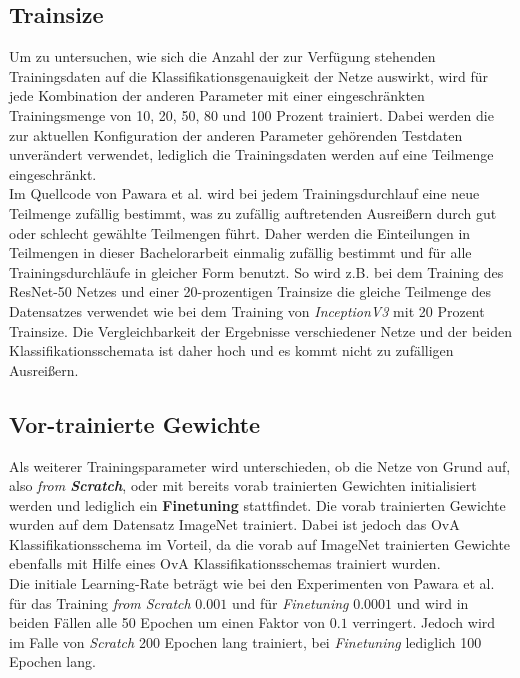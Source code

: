 \subsection{Trainsize}
\label{ch:methodik_trainsize}
Um zu untersuchen, wie sich die Anzahl der zur Verfügung stehenden Trainingsdaten auf die Klassifikationsgenauigkeit der Netze auswirkt, wird für jede Kombination der anderen Parameter mit einer eingeschränkten Trainingsmenge von 10, 20, 50, 80 und 100 Prozent trainiert. Dabei werden die zur aktuellen Konfiguration der anderen Parameter gehörenden Testdaten unverändert verwendet, lediglich die Trainingsdaten werden auf eine Teilmenge eingeschränkt.\\

Im Quellcode von Pawara et al. \cite{pawaraWebsiteCode} wird bei jedem Trainingsdurchlauf eine neue Teilmenge zufällig bestimmt, was zu zufällig auftretenden Ausreißern durch gut oder schlecht gewählte Teilmengen führt.
Daher werden die Einteilungen in Teilmengen in dieser Bachelorarbeit einmalig zufällig bestimmt und für alle Trainingsdurchläufe in gleicher Form benutzt. So wird z.B. bei dem Training des ResNet-50 Netzes und einer 20-prozentigen Trainsize die gleiche Teilmenge des Datensatzes verwendet wie bei dem Training von \textit{InceptionV3} mit 20 Prozent Trainsize. Die Vergleichbarkeit der Ergebnisse verschiedener Netze und der beiden Klassifikationsschemata ist daher hoch und es kommt nicht zu zufälligen Ausreißern.
\newpage
\subsection{Vor-trainierte Gewichte}
\label{ch:methodik_gewichte}
Als weiterer Trainingsparameter wird unterschieden, ob die Netze von Grund auf, also \textit{from \textbf{Scratch}}, oder mit bereits vorab trainierten Gewichten initialisiert werden und lediglich ein \textbf{Finetuning} stattfindet. Die vorab trainierten Gewichte wurden auf dem Datensatz ImageNet \cite{imagenet} trainiert.
Dabei ist jedoch das OvA Klassifikationsschema im Vorteil, da die vorab auf ImageNet \cite{imagenet} trainierten Gewichte ebenfalls mit Hilfe eines OvA Klassifikationsschemas trainiert wurden.\\

Die initiale Learning-Rate beträgt wie bei den Experimenten von Pawara et al. \cite{pawaraPaper} für das Training \textit{from Scratch} $0.001$ und für \textit{Finetuning} $0.0001$ und wird in beiden Fällen alle 50 Epochen um einen Faktor von $0.1$ verringert. Jedoch wird im Falle von \textit{Scratch} 200 Epochen lang trainiert, bei \textit{Finetuning} lediglich 100 Epochen lang.



